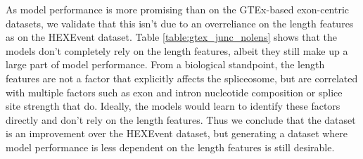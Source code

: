 \begin{table}[h!]
	\centering
	\caption{Performance on the GTEx-based intron-centric dataset with and without length features. 
	}
	\label{table:gtex_junc_nolens}
\end{table}

As model performance is more promising than on the GTEx-based exon-centric datasets, we validate that this isn't due to an overreliance on the length features as on the HEXEvent dataset. Table \ref{table:gtex_junc_nolens} shows that the models don't completely rely on the length features, albeit they still make up a large part of model performance. From a biological standpoint, the length features are not a factor that explicitly affects the spliceosome, but are correlated with multiple factors such as exon and intron nucleotide composition \cite{lengthsnucleotidecom} or splice site strength \cite{lengthsref2} that do. Ideally, the models would learn to identify these factors directly and don't rely on the length features. Thus we conclude that the dataset is an improvement over the HEXEvent dataset, but generating a dataset where model performance is less dependent on the length features is still desirable. 






